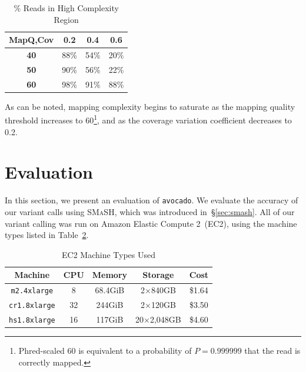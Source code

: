\documentclass{acm_proc_article-sp}
\begin{document}
\begin{table}[h]
\caption{\% Reads in High Complexity Region}
\begin{center}
\begin{tabular}{| c || c | c | c |}
\hline
\bf MapQ,Cov & \bf 0.2 & \bf 0.4 & \bf 0.6 \\
\hline
\hline
\bf 40 & 88\% & 54\% & 20\% \\
\bf 50 & 90\% & 56\% & 22\% \\
\bf 60 & 98\% & 91\% & 88\% \\
\hline 
\end{tabular}
\end{center}
\label{tab:filter}
\end{table}

As can be noted, mapping complexity begins to saturate as the mapping quality threshold increases to 60\footnote{Phred-scaled 60 is
equivalent to a probability of $P=0.999999$ that the read is correctly mapped.}, and as the coverage variation coefficient decreases to 0.2.

\section{Evaluation}
\label{sec:evaluation}


In this section, we present an evaluation of \texttt{avocado}. We evaluate the accuracy of our variant calls using \textsc{SMaSH}, which
was introduced in~\S\ref{sec:smash}. All of our variant calling was run on Amazon Elastic Compute 2~(EC2), using the machine types
listed in Table~\ref{tab:machines}.

\begin{table}[h]
\caption{EC2 Machine Types Used}
\begin{center}
\begin{tabular}{| c || c | c | c | c |}
\hline
\bf Machine & \bf CPU & \bf Memory\footnotemark & \bf Storage & \bf Cost\footnotemark \\
\hline
\hline
\texttt{m2.4xlarge} & 8 & 68.4GiB & 2$\times$840GB & \$1.64 \\
\texttt{cr1.8xlarge} & 32 & 244GiB & 2$\times$120GB & \$3.50 \\
\texttt{hs1.8xlarge} & 16 & 117GiB & 20$\times$2,048GB & \$4.60 \\
\hline 
\end{tabular}
\end{center}
\label{tab:machines}
\end{table}
\end{document}

